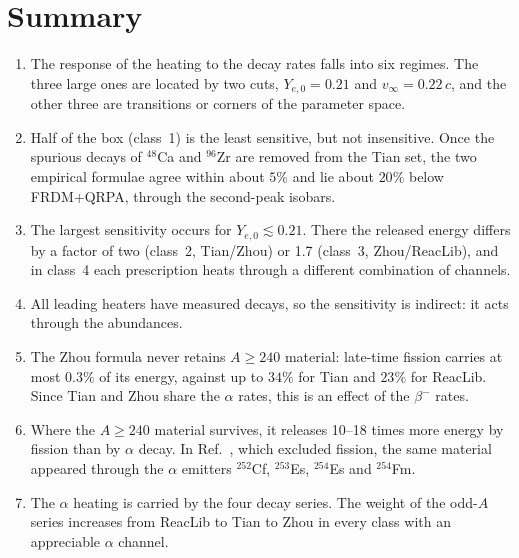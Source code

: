 \section{Summary}\label{sec:res_nucleo_summary}

\begin{enumerate}
  \item The response of the heating to the decay rates falls into six regimes.
  The three large ones are located by two cuts, $Y_{e,0}=0.21$ and $v_\infty=0.22\,c$, and the other three are transitions or corners of the parameter space.
  \item Half of the box (class~1) is the least sensitive, but not insensitive.
  Once the spurious decays of ${}^{48}$Ca and ${}^{96}$Zr are removed from the Tian set, the two empirical formulae agree within about $5\%$ and lie about $20\%$ below FRDM+QRPA, through the second-peak isobars.
  \item The largest sensitivity occurs for $Y_{e,0}\lesssim0.21$.
  There the released energy differs by a factor of two (class~2, Tian/Zhou) or 1.7 (class~3, Zhou/ReacLib), and in class~4 each prescription heats through a different combination of channels.
  \item All leading heaters have measured decays, so the sensitivity is indirect: it acts through the abundances.
  \item The Zhou formula never retains $A\geq240$ material: late-time fission carries at most $0.3\%$ of its energy, against up to $34\%$ for Tian and $23\%$ for ReacLib.
  Since Tian and Zhou share the $\alpha$ rates, this is an effect of the $\beta^-$ rates.
  \item Where the $A\geq240$ material survives, it releases 10--18 times more energy by fission than by $\alpha$ decay.
  In Ref.~\cite{hernandez_porras_features_2027}, which excluded fission, the same material appeared through the $\alpha$ emitters ${}^{252}$Cf, ${}^{253}$Es, ${}^{254}$Es and ${}^{254}$Fm.
  \item The $\alpha$ heating is carried by the four decay series.
  The weight of the odd-$A$ series increases from ReacLib to Tian to Zhou in every class with an appreciable $\alpha$ channel.
\end{enumerate}